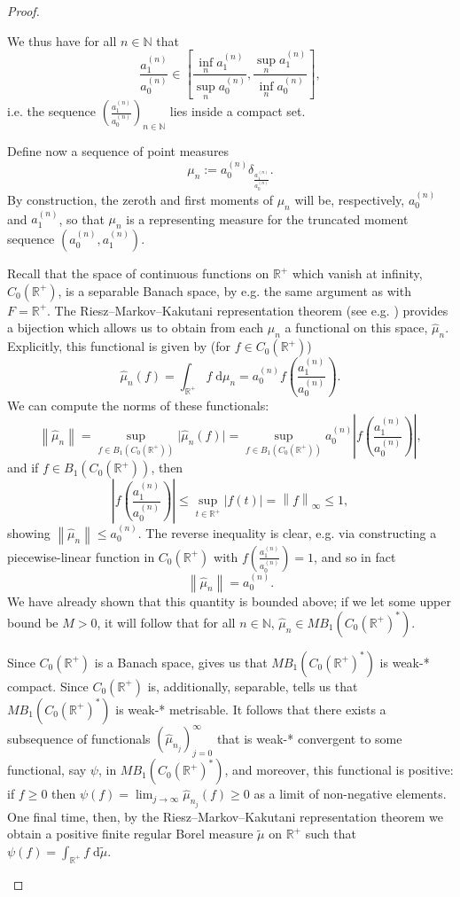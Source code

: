 \documentclass[11pt,reqno]{amsart}
\newcommand\norm[1]{\left\lVert#1\right\rVert}
\def\d{\delta}
\def\rmd{\mathrm{d}}
\def\NN{\mathbb{N}}
\def\RR{\mathbb{R}}
\theoremstyle{definition}
\numberwithin{equation}{section}
\renewcommand{\tilde}{\widetilde}
\renewcommand{\hat}{\widehat}
\begin{document}
\begin{proof}
\begin{enumerate}[align=left]
        We thus have for all \(n \in \NN\) that
        \[
            \frac{a_1^{(n)}}{a_0^{(n)}} \in \left[\frac{\inf_n a^{(n)}_1}{\sup_n a_0^{(n)}}, \frac{\sup_n a^{(n)}_1}{\inf_n a_0^{(n)}}\right],
        \]
        i.e. the sequence \((\frac{a_1^{(n)}}{a_0^{(n)}})_{n \in \NN}\) lies inside a compact set.

        Define now a sequence of point measures
        \[
            \mu_n := a_0^{(n)}\d_{\frac{a_1^{(n)}}{a_0^{(n)}}}.
        \]
        By construction, the zeroth and first moments of \(\mu_n\) will be, respectively, \(a_0^{(n)}\) and \(a_1^{(n)}\), so that \(\mu_n\) is a representing measure for the truncated moment sequence \((a_0^{(n)}, a_1^{(n)})\).

        Recall that the space of continuous functions on \(\RR^+\) which vanish at infinity, \(C_0(\RR^+)\), is a separable Banach space, by e.g. the same argument as \cite{Sto01} with \(F = \RR^+\). The Riesz--Markov--Kakutani representation theorem (see e.g. \cite[Theorem 2.17]{Rud87}) provides a bijection which allows us to obtain from each \(\mu_n\) a functional on this space, \(\hat{\mu}_n\). Explicitly, this functional is given by (for \(f \in C_0(\RR^+)\))
        \[
            \hat{\mu}_n(f) = \int_{\RR^+} f \; \rmd \mu_n = a_0^{(n)}f\left(\frac{a_1^{(n)}}{a_0^{(n)}}\right).
        \]
        We can compute the norms of these functionals:
        \[
            \norm{\hat{\mu}_n} = \sup_{f \in B_1(C_0(\RR^+))} \lvert \hat{\mu}_n(f) \rvert = \sup_{f \in B_1(C_0(\RR^+))} a_0^{(n)} \left\lvert f\left(\frac{a_1^{(n)}}{a_0^{(n)}}\right)\right\rvert,
        \]
        and if \(f \in  B_1(C_0(\RR^+))\), then
        \[
            \left\lvert f\left(\frac{a_1^{(n)}}{a_0^{(n)}}\right)\right\rvert \leq \sup_{t \in \RR^+} \lvert f(t) \rvert = \norm{f}_{\infty} \leq 1,
        \]
        showing \(\norm{\hat{\mu}_n} \leq a_0^{(n)}\). The reverse inequality is clear, e.g. via constructing a piecewise-linear function in \(C_0(\RR^+)\) with \(f\left(\frac{a_1^{(n)}}{a_0^{(n)}}\right) = 1\), and so in fact
        \[
            \norm{\hat{\mu}_n} = a_0^{(n)}.
        \]
        We have already shown that this quantity is bounded above; if we let some upper bound be \(M > 0\), it will follow that for all \(n \in \NN\), \(\hat{\mu}_n \in MB_1(C_0(\RR^+)^*)\).

        Since \(C_0(\RR^+)\) is a Banach space, \cite[V.3.1]{Con90} gives us that \(MB_1(C_0(\RR^+)^*)\) is weak-* compact. Since \(C_0(\RR^+)\) is, additionally, separable, \cite[V.5.1]{Con90} tells us that \(MB_1(C_0(\RR^+)^*)\) is weak-* metrisable. It follows that there exists a subsequence of functionals \((\hat{\mu}_{n_j})_{j=0}^{\infty}\) that is weak-* convergent to some functional, say \(\psi\), in  \(MB_1(C_0(\RR^+)^*)\), and moreover, this functional is positive: if \(f \geq 0\) then \(\psi(f) = \lim_{j \to \infty} \hat{\mu}_{n_j}(f) \geq 0 \) as a limit of non-negative elements. One final time, then, by the Riesz--Markov--Kakutani representation theorem we obtain a positive finite regular Borel measure \(\tilde{\mu}\) on \(\RR^+\) such that \(\psi(f) = \int_{\RR^+} f \; \rmd \tilde{\mu}\).


\end{enumerate}
\end{proof}
\end{document}
